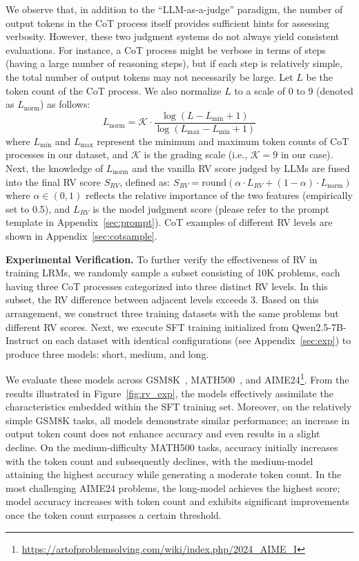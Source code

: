 \documentclass{article}
\begin{document}
We observe that, in addition to the ``LLM-as-a-judge'' paradigm, the number of output tokens in the CoT process itself provides sufficient hints for assessing verbosity. However, these two judgment systems do not always yield consistent evaluations. For instance, a CoT process might be verbose in terms of steps (having a large number of reasoning steps), but if each step is relatively simple, the total number of output tokens may not necessarily be large. Let $L$ be the token count of the CoT process. We also normalize $L$ to a scale of 0 to 9 (denoted as $L_{\text{norm}}$) as follows:
\begin{equation}
    L_{\text{norm}} = \mathcal{K} \cdot \frac{\log(L - L_{\text{min}} + 1)}{\log(L_{\text{max}} - L_{\text{min}} + 1)}
\end{equation}
where $L_{\text{min}}$ and $L_{\text{max}}$ represent the minimum and maximum token counts of CoT processes in our dataset, and $\mathcal{K}$ is the grading scale (i.e., $\mathcal{K}=9$ in our case). Next, the knowledge of $L_{\text{norm}}$ and the vanilla RV score judged by LLMs are fused into the final RV score $S_{RV}$, defined as: $S_{RV} = \text{round}(\alpha \cdot L_{RV} + (1 - \alpha) \cdot L_{\text{norm}})$
where $\alpha \in (0,1)$ reflects the relative importance of the two features (empirically set to 0.5), and $L_{RV}$ is the model judgment score (please refer to the prompt template in Appendix~\ref{sec:prompt}). CoT examples of different RV levels are shown in Appendix~\ref{sec:cotsample}.




\textbf{Experimental Verification.} To further verify the effectiveness of RV in training LRMs, we randomly sample a subset consisting of 10K problems, each having three CoT processes categorized into three distinct RV levels. In this subset, the RV difference between adjacent levels exceeds 3. Based on this arrangement, we construct three training datasets with the same problems but different RV scores. Next, we execute SFT training initialized from Qwen2.5-7B-Instruct on each dataset with identical configurations (see Appendix~\ref{sec:exp}) to produce three models: short, medium, and long.

We evaluate these models across GSM8K~\cite{DBLP:journals/corr/abs-2110-14168}, MATH500~\cite{DBLP:conf/nips/HendrycksBKABTS21}, and AIME24\footnote{\url{https://artofproblemsolving.com/wiki/index.php/2024_AIME_I}}. From the results illustrated in Figure~\ref{fig:rv_exp}, the models effectively assimilate the characteristics embedded within the SFT training set. Moreover, on the relatively simple GSM8K tasks, all models demonstrate similar performance; an increase in output token count does not enhance accuracy and even results in a slight decline. On the medium-difficulty MATH500 tasks, accuracy initially increases with the token count and subsequently declines, with the medium-model attaining the highest accuracy while generating a moderate token count. In the most challenging AIME24 problems, the long-model achieves the highest score; model accuracy increases with token count and exhibits significant improvements once the token count surpasses a certain threshold.
\end{document}
